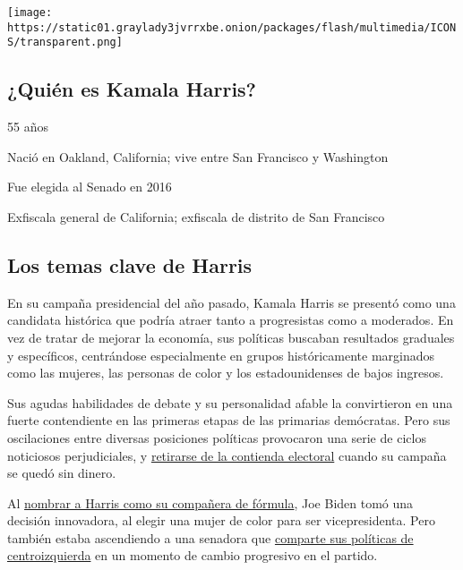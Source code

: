 \texttt{[image: https://static01.graylady3jvrrxbe.onion/packages/flash/multimedia/ICONS/transparent.png]}

\hypertarget{quiuxe9n-es-kamala-harris}{%
\subsection{¿Quién es Kamala Harris?}\label{quiuxe9n-es-kamala-harris}}

55 años

Nació en Oakland, California; vive entre San Francisco y Washington

Fue elegida al Senado en 2016

Exfiscala general de California; exfiscala de distrito de San Francisco

\hypertarget{los-temas-clave-de-harris}{%
\subsection{Los temas clave de Harris}\label{los-temas-clave-de-harris}}

En su campaña presidencial del año pasado, Kamala Harris se presentó
como una candidata histórica que podría atraer tanto a progresistas como
a moderados. En vez de tratar de mejorar la economía, sus políticas
buscaban resultados graduales y específicos, centrándose especialmente
en grupos históricamente marginados como las mujeres, las personas de
color y los estadounidenses de bajos ingresos.

Sus agudas habilidades de debate y su personalidad afable la
convirtieron en una fuerte contendiente en las primeras etapas de las
primarias demócratas. Pero sus oscilaciones entre diversas posiciones
políticas provocaron una serie de ciclos noticiosos perjudiciales, y
\href{https://www.nytimes3xbfgragh.onion/2019/12/03/us/politics/kamala-harris-campaign-drops-out.html}{retirarse
de la contienda electoral} cuando su campaña se quedó sin dinero.

Al
\href{https://www.nytimes3xbfgragh.onion/es/2020/08/11/espanol/estados-unidos/kamala-harris-joe-biden-vicepresidenta.html}{nombrar
a Harris como su compañera de fórmula}, Joe Biden tomó una decisión
innovadora, al elegir una mujer de color para ser vicepresidenta. Pero
también estaba ascendiendo a una senadora que
\href{https://www.nytimes3xbfgragh.onion/2020/08/11/us/politics/kamala-harris-joe-biden-running-mate.html}{comparte
sus políticas de centroizquierda} en un momento de cambio progresivo en
el partido.


